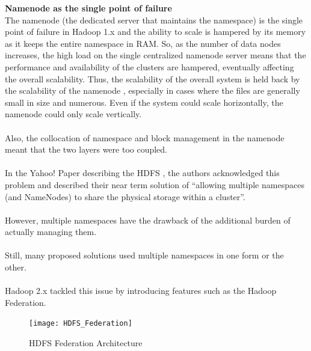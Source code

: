 \documentclass[a4paper,12pt,oneside]{report}
\begin{document}
\textbf{Namenode as the single point of failure}\\
The namenode (the dedicated server that maintains the namespace) is the single point of failure in Hadoop 1.x 
and the ability to scale is hampered by its memory as it keeps the entire namespace in RAM. 
So, as the number of data nodes increases, the high load on the single centralized namenode server means 
that the performance and availability of the clusters are hampered, eventually affecting the overall scalability. 
Thus, the scalability of the overall system is held back by the scalability of the namenode \cite{Shvachko2010}, especially in 
cases where the files are generally small in size and numerous. Even if the system could scale horizontally, the 
namenode could only scale vertically.\\ 
\\
Also, the collocation of namespace and block management in the namenode meant that the two layers were too coupled.\\ 
\\
In the Yahoo! Paper describing the HDFS \cite{Shvachko2010b}, the authors acknowledged this problem and described their near term 
solution of “allowing multiple namespaces (and NameNodes) to share the physical storage within a cluster”.\\
\\
However, multiple namespaces have the drawback of the additional burden of actually managing them.\\
\\
Still, many proposed solutions used multiple namespaces in one form or the other. \cite{Singh2012}\\
\\
Hadoop 2.x tackled this issue by introducing features such as the Hadoop Federation.

\begin{figure}[h!]
        \centering
        \texttt{[image: HDFS\_Federation]}
        \caption{HDFS Federation Architecture}
\end{figure}
\end{document}
